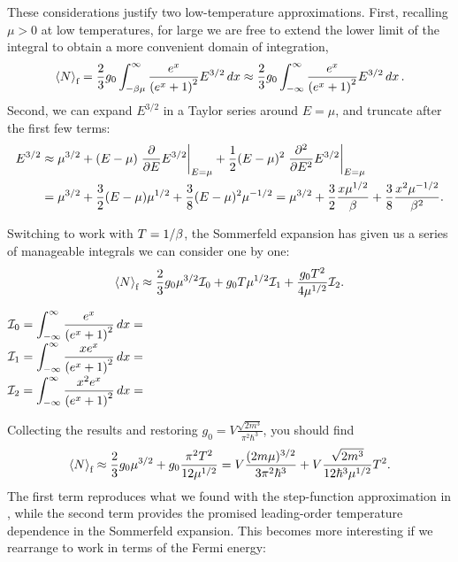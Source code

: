 These considerations justify two low-temperature approximations.
First, recalling $\mu > 0$ at low temperatures, for large \be we are free to extend the lower limit of the integral to obtain a more convenient domain of integration,
\begin{equation*}
  \left\langle N \right\rangle_{\text{f}} = \frac{2}{3} g_0 \int_{-\beta\mu}^{\infty} \frac{e^x}{\left(e^x + 1\right)^2} E^{3 / 2} \mathop{dx} \approx \frac{2}{3} g_0 \int_{-\infty}^{\infty} \frac{e^x}{\left(e^x + 1\right)^2} E^{3 / 2} \mathop{dx}.
\end{equation*}
Second, we can expand $E^{3 / 2}$ in a Taylor series around $E = \mu$, and truncate after the first few terms:
\begin{align*}
  E^{3 / 2} & \approx \mu^{3 / 2} + (E - \mu) \left. \frac{\partial }{\partial E} E^{3 / 2}\right|_{E = \mu} + \frac{1}{2} (E - \mu)^2 \left. \frac{\partial^2 }{\partial E^2} E^{3 / 2}\right|_{E = \mu} \\
            & = \mu^{3 / 2} + \frac{3}{2} (E - \mu) \mu^{1 / 2} + \frac{3}{8} (E - \mu)^2 \mu^{-1 / 2} = \mu^{3 / 2} + \frac{3}{2} \frac{x \mu^{1 / 2}}{\beta} + \frac{3}{8} \frac{x^2 \mu^{-1 / 2}}{\beta^2}.
\end{align*}

Switching to work with $T = 1 / \beta$, the Sommerfeld expansion has given us a series of manageable integrals we can consider one by one:
\begin{equation*}
  \left\langle N \right\rangle_{\text{f}} \approx \frac{2}{3} g_0 \mu^{3 / 2} \mathcal I_0 + g_0 T \mu^{1 / 2} \mathcal I_1 + \frac{g_0 T^2}{4\mu^{1 / 2}} \mathcal I_2.
\end{equation*}
\begin{mdframed}
  $\displaystyle \mathcal I_0 = \int_{-\infty}^{\infty} \frac{e^x}{\left(e^x + 1\right)^2} \mathop{dx} = $ \\[70 pt]
  $\displaystyle \mathcal I_1 = \int_{-\infty}^{\infty} \frac{x e^x}{\left(e^x + 1\right)^2} \mathop{dx} = $ \\[70 pt]
  $\displaystyle \mathcal I_2 = \int_{-\infty}^{\infty} \frac{x^2 e^x}{\left(e^x + 1\right)^2} \mathop{dx} = $ \\[70 pt]
\end{mdframed}
Collecting the results and restoring $g_0 = V \frac{\sqrt{2m^3}}{\pi^2 \hbar^3}$, you should find
\begin{equation*}
  \left\langle N \right\rangle_{\text{f}} \approx \frac{2}{3} g_0 \mu^{3 / 2} + g_0 \frac{\pi^2 T^2}{12\mu^{1 / 2}} = V \frac{(2m\mu)^{3 / 2}}{3\pi^2\hbar^3} + V \frac{\sqrt{2m^3}}{12\hbar^3 \mu^{1 / 2}} T^2.
\end{equation*}
The first term reproduces what we found with the step-function approximation in , while the second term provides the promised leading-order temperature dependence in the Sommerfeld expansion.
This becomes more interesting if we rearrange  to work in terms of the Fermi energy:
\begin{mdframed}
  \ \\[100 pt]
\end{mdframed}

